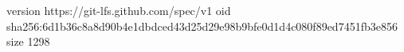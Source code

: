 version https://git-lfs.github.com/spec/v1
oid sha256:6d1b36c8a8d90b4e1dbdced43d25d29e98b9bfe0d1d4c080f89ed7451fb3e856
size 1298
